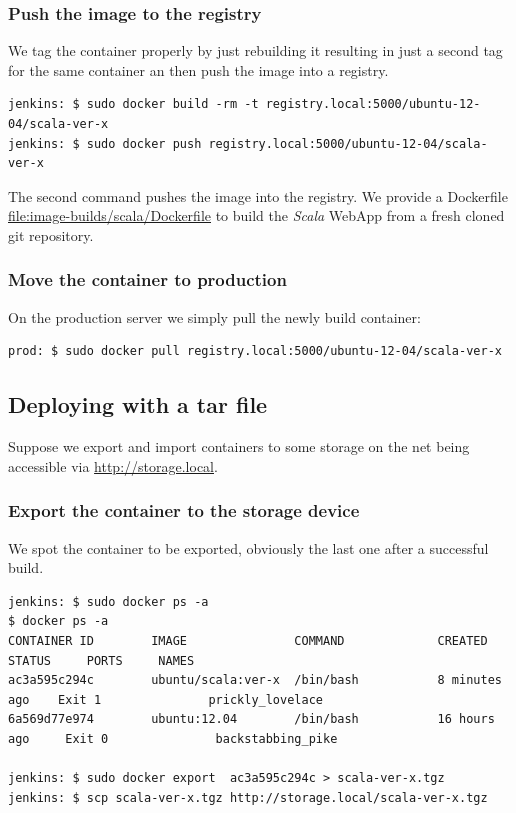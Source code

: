 \documentclass[captions=tableheading]{article}
\begin{document}
\subsubsection{Push the image to the registry}
\label{sec-6-2-1}

We tag the container properly by just rebuilding it resulting in just a second tag for the same container an then push the image into a registry.

\begin{verbatim}
jenkins: $ sudo docker build -rm -t registry.local:5000/ubuntu-12-04/scala-ver-x
jenkins: $ sudo docker push registry.local:5000/ubuntu-12-04/scala-ver-x
\end{verbatim}
The second command pushes the image into the registry. We provide a Dockerfile  \hyperref[Dockerfile]{file:image-builds/scala/Dockerfile} to build the \emph{Scala} WebApp from a fresh cloned git repository.
\subsubsection{Move the container to production}
\label{sec-6-2-2}

On the production server we simply pull the newly build container:

\begin{verbatim}
prod: $ sudo docker pull registry.local:5000/ubuntu-12-04/scala-ver-x
\end{verbatim}
\subsection{Deploying with a tar file}
\label{sec-6-3}

Suppose we export and import containers to some storage on the net being accessible via \href{http://storage.local}{http://storage.local}.
\subsubsection{Export the container to the storage device}
\label{sec-6-3-1}

We spot the container to be exported, obviously the last one after a successful build.

\begin{verbatim}
jenkins: $ sudo docker ps -a
$ docker ps -a
CONTAINER ID        IMAGE               COMMAND             CREATED          STATUS     PORTS     NAMES
ac3a595c294c        ubuntu/scala:ver-x  /bin/bash           8 minutes ago    Exit 1               prickly_lovelace    
6a569d77e974        ubuntu:12.04        /bin/bash           16 hours ago     Exit 0               backstabbing_pike 

jenkins: $ sudo docker export  ac3a595c294c > scala-ver-x.tgz
jenkins: $ scp scala-ver-x.tgz http://storage.local/scala-ver-x.tgz
\end{verbatim}
\end{document}
